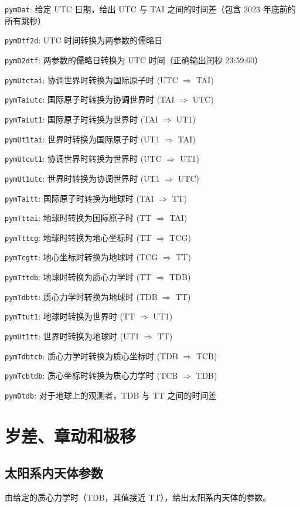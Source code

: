 \documentclass[11pt]{article}
\begin{document}
\texttt{pymDat}: 给定 UTC 日期，给出 UTC 与 TAI 之间的时间差（包含 2023 年底前的所有跳秒）

\texttt{pymDtf2d}: UTC 时间转换为两参数的儒略日

\texttt{pymD2dtf}: 两参数的儒略日转换为 UTC 时间（正确输出闰秒 23:59:60）

\texttt{pymUtctai}: 协调世界时转换为国际原子时 (UTC $\Rightarrow$ TAI)

\texttt{pymTaiutc}: 国际原子时转换为协调世界时 (TAI $\Rightarrow$ UTC)

\texttt{pymTaiut1}: 国际原子时转换为世界时 (TAI $\Rightarrow$ UT1)

\texttt{pymUt1tai}: 世界时转换为国际原子时 (UT1 $\Rightarrow$ TAI)

\texttt{pymUtcut1}: 协调世界时转换为世界时 (UTC $\Rightarrow$ UT1)

\texttt{pymUt1utc}: 世界时转换为协调世界时 (UT1 $\Rightarrow$ UTC)

\texttt{pymTaitt}: 国际原子时转换为地球时 (TAI $\Rightarrow$ TT)

\texttt{pymTttai}: 地球时转换为国际原子时 (TT $\Rightarrow$ TAI)

\texttt{pymTttcg}: 地球时转换为地心坐标时 (TT $\Rightarrow$ TCG)

\texttt{pymTcgtt}: 地心坐标时转换为地球时 (TCG $\Rightarrow$ TT)

\texttt{pymTttdb}: 地球时转换为质心力学时 (TT $\Rightarrow$ TDB)

\texttt{pymTdbtt}: 质心力学时转换为地球时 (TDB $\Rightarrow$ TT)

\texttt{pymTtut1}: 地球时转换为世界时 (TT $\Rightarrow$ UT1)

\texttt{pymUt1tt}: 世界时转换为地球时 (UT1 $\Rightarrow$ TT)

\texttt{pymTdbtcb}: 质心力学时转换为质心坐标时 (TDB $\Rightarrow$ TCB)

\texttt{pymTcbtdb}: 质心坐标时转换为质心力学时 (TCB $\Rightarrow$ TDB)

\texttt{pymDtdb}: 对于地球上的观测者，TDB 与 TT 之间的时间差

\newpage
\section{岁差、章动和极移}

\subsection{太阳系内天体参数}
由给定的质心力学时（TDB，其值接近 TT），给出太阳系内天体的参数。
\end{document}
